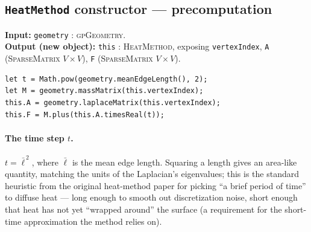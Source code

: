 \documentclass[11pt]{article}
\newcommand{\code}[1]{\texttt{#1}}
\newcommand{\func}[1]{\texttt{\textbf{#1}}}
\newcommand{\type}[1]{\textsc{#1}}
\begin{document}
\begin{center}
\end{center}

\subsection{\func{HeatMethod} constructor --- precomputation}
\label{sec:heatmethod-ctor}
\textbf{Input:} \code{geometry} : \type{gpGeometry}.\\
\textbf{Output (new object):} \code{this} : \type{HeatMethod}, exposing
\code{vertexIndex}, \code{A} (\type{SparseMatrix} $V\times V$), \code{F}
(\type{SparseMatrix} $V\times V$).

\begin{lstlisting}
let t = Math.pow(geometry.meanEdgeLength(), 2);
let M = geometry.massMatrix(this.vertexIndex);
this.A = geometry.laplaceMatrix(this.vertexIndex);
this.F = M.plus(this.A.timesReal(t));
\end{lstlisting}

\paragraph{The time step $t$.} $t = \bar\ell^{\,2}$, where $\bar\ell$ is the mean edge
length. Squaring a length gives an area-like quantity, matching the units of the
Laplacian's eigenvalues; this is the standard heuristic from the original heat-method paper
for picking ``a brief period of time'' to diffuse heat --- long enough to smooth out
discretization noise, short enough that heat has not yet ``wrapped around'' the surface (a
requirement for the short-time approximation the method relies on).
\end{document}
